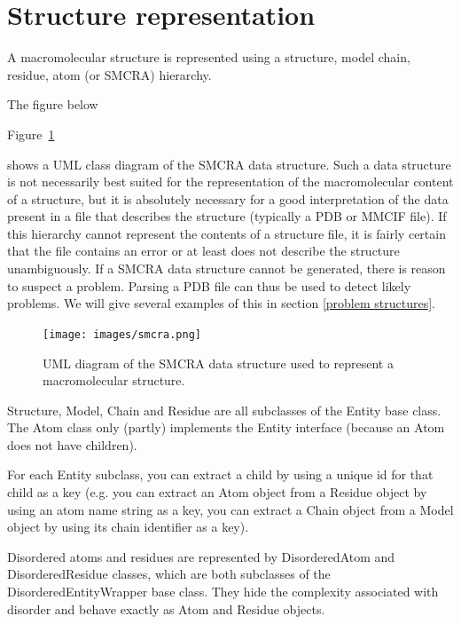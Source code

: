 \documentclass{report}
\begin{document}
\section{Structure representation}

A macromolecular structure is represented using a structure, model chain,
residue, atom (or SMCRA) hierarchy.
\begin{htmlonly}
The figure below
\end{htmlonly}
\begin{latexonly}
Figure~\ref{fig:smcra}
\end{latexonly}
shows a UML
class diagram of the SMCRA data structure.  Such a data structure is not
necessarily best suited for the representation of the macromolecular content of
a structure, but it is absolutely necessary for a good interpretation of the
data present in a file that describes the structure (typically a PDB or MMCIF
file). If this hierarchy cannot represent the contents of a structure file, it
is fairly certain that the file contains an error or at least does not describe
the structure unambiguously. If a SMCRA data structure cannot be generated,
there is reason to suspect a problem. Parsing a PDB file can thus be used to
detect likely problems. We will give several examples of this in section
\ref{problem structures}.

\begin{htmlonly}
\label{fig:smcra}
\end{htmlonly}

\begin{latexonly}
\begin{figure}[htbp]
\centering
\texttt{[image: images/smcra.png]}
\caption{UML diagram of the SMCRA data structure
used to represent a macromolecular structure.}
\label{fig:smcra}
\end{figure}
\end{latexonly}

Structure, Model, Chain and Residue are all subclasses of the Entity base class.
The Atom class only (partly) implements the Entity interface (because an Atom
does not have children).

For each Entity subclass, you can extract a child by using a unique id for that
child as a key (e.g. you can extract an Atom object from a Residue object by
using an atom name string as a key, you can extract a Chain object from a Model
object by using its chain identifier as a key).

Disordered atoms and residues are represented by DisorderedAtom and DisorderedResidue
classes, which are both subclasses of the DisorderedEntityWrapper base class.
They hide the complexity associated with disorder and behave exactly as Atom
and Residue objects.
\end{document}
